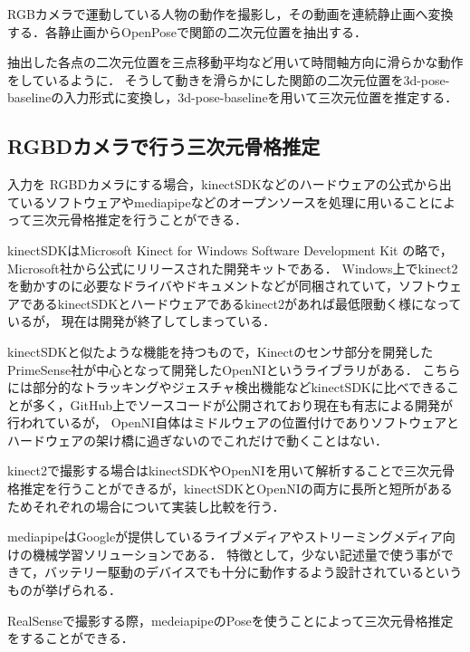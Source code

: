 \documentclass[titlepage]{jarticle}
\begin{document}
RGBカメラで運動している人物の動作を撮影し，その動画を連続静止画へ変換する．各静止画からOpenPoseで関節の二次元位置を抽出する．

抽出した各点の二次元位置を三点移動平均など用いて時間軸方向に滑らかな動作をしているように．
そうして動きを滑らかにした関節の二次元位置を3d-pose-baselineの入力形式に変換し，3d-pose-baselineを用いて三次元位置を推定する．

\subsection{RGBDカメラで行う三次元骨格推定}
入力を
RGBDカメラにする場合，kinectSDK\cite{kinectSDK}などのハードウェアの公式から出ているソフトウェアやmediapipe\cite{cubemos}などのオープンソースを処理に用いることによって三次元骨格推定を行うことができる．

kinectSDKはMicrosoft Kinect for Windows Software Development Kit の略で，Microsoft社から公式にリリースされた開発キットである．
Windows上でkinect2を動かすのに必要なドライバやドキュメントなどが同梱されていて，ソフトウェアであるkinectSDKとハードウェアであるkinect2があれば最低限動く様になっているが，
現在は開発が終了してしまっている．

kinectSDKと似たような機能を持つもので，Kinectのセンサ部分を開発したPrimeSense社が中心となって開発したOpenNIというライブラリがある．
こちらには部分的なトラッキングやジェスチャ検出機能などkinectSDKに比べできることが多く，GitHub上でソースコードが公開されており現在も有志による開発が行われているが，
OpenNI自体はミドルウェアの位置付けでありソフトウェアとハードウェアの架け橋に過ぎないのでこれだけで動くことはない．

kinect2で撮影する場合はkinectSDKやOpenNIを用いて解析することで三次元骨格推定を行うことができるが，kinectSDKとOpenNIの両方に長所と短所があるためそれぞれの場合について実装し比較を行う．

mediapipeはGoogleが提供しているライブメディアやストリーミングメディア向けの機械学習ソリューションである．
特徴として，少ない記述量で使う事ができて，バッテリー駆動のデバイスでも十分に動作するよう設計されているというものが挙げられる．

RealSenseで撮影する際，medeiapipeのPoseを使うことによって三次元骨格推定をすることができる．

\end{document}
